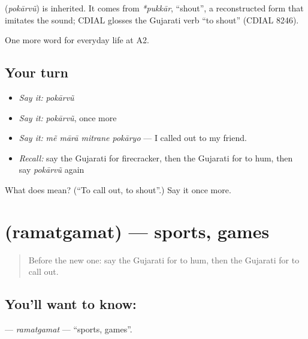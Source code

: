 \begin{cousinweb}
\textbf{} (\emph{pokārvũ}) is inherited. It comes from \emph{*pukkār}, \textquotedblleft{}shout\textquotedblright{}, a reconstructed form that imitates the sound; CDIAL glosses the Gujarati verb \textquotedblleft{}to shout\textquotedblright{} (CDIAL 8246).
\end{cousinweb}

\begin{grammarlens}[title={What you've built}]
One more word for everyday life at A2.
\end{grammarlens}

\subsection*{Your turn}
\begin{itemize}
\raggedright
  \item \emph{Say it:} \emph{pokārvũ}
  \item \emph{Say it:} \emph{pokārvũ}, once more
  \item \emph{Say it:} \emph{mẽ mārā mitrane pokāryo} — I called out to my friend.
  \item \emph{Recall:} say the Gujarati for firecracker, then the Gujarati for to hum, then say \emph{pokārvũ} again
\end{itemize}

\begin{tcolorbox}[breakable,colback=teal!4,colframe=teal!35!black,title={Before you move on}]
What does  mean? (\textquotedblleft{}To call out, to shout\textquotedblright{}.) Say it once more.
\end{tcolorbox}
\section[\texorpdfstring{\gu{રમતગમત} (ramatgamat)}{રમતગમત (ramatgamat)}]{ (ramatgamat) — sports, games}

\label{lesson:GU-C262-ramatgamat}



\begin{quote}
Before the new one: say the Gujarati for to hum, then the Gujarati for to call out.
\end{quote}

\subsection*{You'll want to know: }
\textbf{} — \emph{ramatgamat} — \textquotedblleft{}sports, games\textquotedblright{}.

